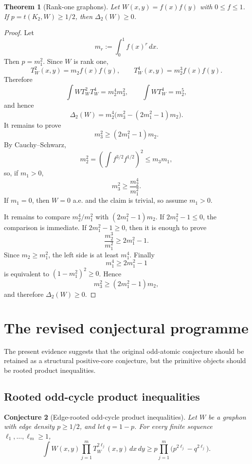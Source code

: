 \documentclass[11pt]{article}
\newtheorem{theorem}{Theorem}[section]
\newtheorem{conjecture}[theorem]{Conjecture}
\theoremstyle{definition}
\begin{document}
\begin{theorem}[Rank-one graphons]\label{thm:rank-one-SG2}
Let $W(x,y)=f(x)f(y)$ with $0\le f\le1$.  If $p=t(K_2,W)\ge1/2$, then $\Delta_2(W)\ge0$.
\end{theorem}

\begin{proof}
Let
\[
  m_r:=\int_0^1 f(x)^r\,dx.
\]
Then $p=m_1^2$.  Since $W$ is rank one,
\[
  T_W^2(x,y)=m_2 f(x)f(y),
  \qquad
  T_W^4(x,y)=m_2^3 f(x)f(y).
\]
Therefore
\[
  \int WT_W^2T_W^4=m_2^4m_3^2,
  \qquad
  \int WT_W^4=m_2^5,
\]
and hence
\[
  \Delta_2(W)=m_2^4\bigl(m_3^2-(2m_1^2-1)m_2\bigr).
\]
It remains to prove
\[
  m_3^2\ge (2m_1^2-1)m_2.
\]
By Cauchy--Schwarz,
\[
  m_2^2=\left(\int f^{3/2}f^{1/2}\right)^2\le m_3m_1,
\]
so, if $m_1>0$,
\[
  m_3^2\ge \frac{m_2^4}{m_1^2}.
\]
If $m_1=0$, then $W=0$ a.e. and the claim is trivial, so assume $m_1>0$.

It remains to compare $m_2^4/m_1^2$ with $(2m_1^2-1)m_2$.  If $2m_1^2-1\le0$, the comparison is immediate.  If $2m_1^2-1\ge0$, then it is enough to prove
\[
  \frac{m_2^3}{m_1^2}\ge 2m_1^2-1.
\]
Since $m_2\ge m_1^2$, the left side is at least $m_1^4$.  Finally
\[
  m_1^4\ge 2m_1^2-1
\]
is equivalent to $(1-m_1^2)^2\ge0$.  Hence
\[
  m_3^2\ge (2m_1^2-1)m_2,
\]
and therefore $\Delta_2(W)\ge0$.
\end{proof}

\section{The revised conjectural programme}

The present evidence suggests that the original odd-atomic conjecture should be retained as a structural positive-core conjecture, but the primitive objects should be rooted product inequalities.

\subsection{Rooted odd-cycle product inequalities}

\begin{conjecture}[Edge-rooted odd-cycle product inequalities]\label{conj:edge-rooted-products}
Let $W$ be a graphon with edge density $p\ge1/2$, and let $q=1-p$.  For every finite sequence $\ell_1,\dots,\ell_m\ge1$,
\begin{equation}\label{eq:edge-rooted-product-conj}
  \int W(x,y)\prod_{j=1}^m T_W^{2\ell_j}(x,y)\,dx\,dy
  \ge
  p\prod_{j=1}^m\bigl(p^{2\ell_j}-q^{2\ell_j}\bigr).
\end{equation}
\end{conjecture}
\end{document}
